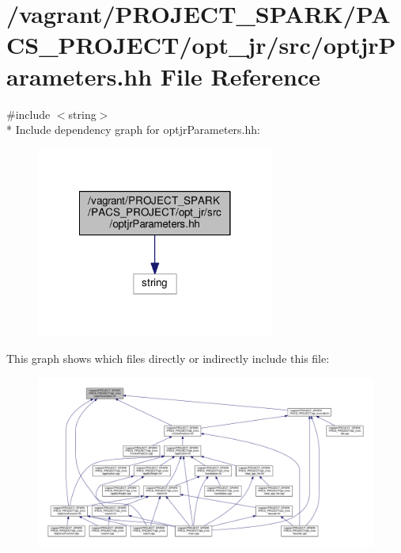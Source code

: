 \hypertarget{optjrParameters_8hh}{\section{/vagrant/\-P\-R\-O\-J\-E\-C\-T\-\_\-\-S\-P\-A\-R\-K/\-P\-A\-C\-S\-\_\-\-P\-R\-O\-J\-E\-C\-T/opt\-\_\-jr/src/optjr\-Parameters.hh File Reference}
\label{optjrParameters_8hh}
}
{\ttfamily \#include $<$string$>$}\\*
Include dependency graph for optjr\-Parameters.\-hh\-:\nopagebreak
\begin{figure}[H]
\begin{center}
\leavevmode
\includegraphics[width=222pt]{optjrParameters_8hh__incl}
\end{center}
\end{figure}
This graph shows which files directly or indirectly include this file\-:\nopagebreak
\begin{figure}[H]
\begin{center}
\leavevmode
\includegraphics[width=350pt]{optjrParameters_8hh__dep__incl}
\end{center}
\end{figure}
